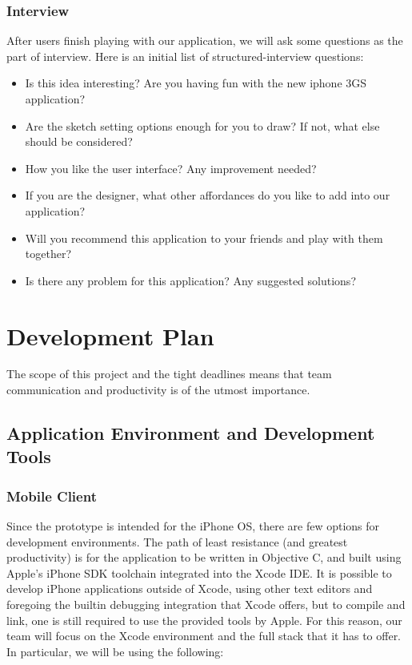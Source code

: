 \documentclass{www2010-submission}
\begin{document}
\subsubsection{Interview}

After users finish playing with our application, we will ask some questions as
the part of interview.  Here is an initial list of structured-interview
questions:
\begin{itemize}
\item Is this idea interesting? Are you having fun with the new iphone 3GS application?
\item Are the sketch setting options enough for you to draw? If not, what else should be considered?
\item How you like the user interface? Any improvement needed?
\item If you are the designer, what other affordances do you like to add into our application?
\item Will you recommend this application to your friends and play with them together?
\item Is there any problem for this application? Any suggested solutions?
\end{itemize}




\section{Development Plan}

The scope of this project and the tight deadlines means that team communication
and productivity is of the utmost importance.

\subsection{ Application Environment and Development Tools }

\subsubsection{ Mobile Client }

Since the prototype is intended for the iPhone OS, there are few options for
development environments.  The path of least resistance (and greatest
productivity) is for the application to be written in Objective C, and built
using Apple's iPhone SDK toolchain integrated into the Xcode IDE.  It is
possible to develop iPhone applications outside of Xcode, using other text
editors and foregoing the builtin debugging integration that Xcode offers, but
to compile and link, one is still required to use the provided tools by Apple.
For this reason, our team will focus on the Xcode environment and the full
stack that it has to offer.  In particular, we will be using the following:
\end{document}
